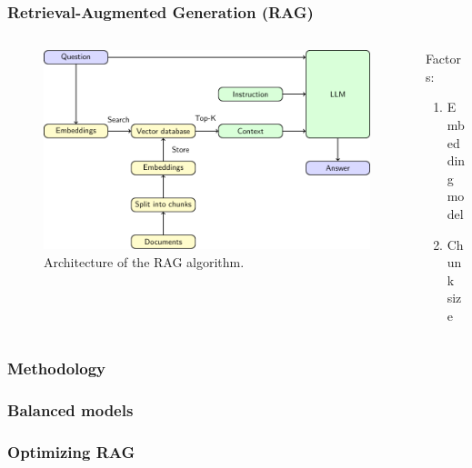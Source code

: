 \documentclass{beamer}
\begin{document}
\begin{frame}
  \frametitle{Retrieval-Augmented Generation (RAG)}
  \begin{columns}[onlytextwidth,T]
    \begin{column}{0.75\textwidth}
      \begin{figure}[h]
        \includegraphics[scale=0.6]{src/fig/pdfs/tikz/RAG_scheme.pdf}
        \caption{Architecture of the RAG algorithm.}
       \end{figure}
    \end{column}

      \begin{column}{0.75\textwidth}
        Factors:  
        \begin{enumerate}
          \item Embedding \\model
          \item Chunk size
        \end{enumerate}
    \end{column}
  \end{columns}
  
  
\end{frame}

\begin{frame}
  \frametitle{Methodology}
\end{frame}

\begin{frame}
  \frametitle{Balanced models}
\end{frame}

\begin{frame}
  \frametitle{Optimizing RAG}
\end{frame}
\end{document}
